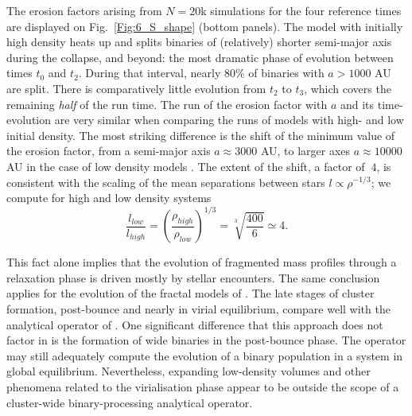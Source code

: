  The erosion factors arising from $N = 20$k simulations for the four reference times are displayed on  Fig.~\ref{Fig:6_S_shape} (bottom panels). 
%
The model with initially high density heats up and splits binaries of  (relatively) shorter semi-major axis  during the collapse, and beyond: the most dramatic phase of evolution between times  $t_0$ and $t_2$. During that interval,  nearly 80\% of  binaries with $a > 1000 $ AU are split. There is comparatively little evolution from $t_2$ to $t_3$,  which covers the remaining {\it half} of the run time.  
The run of the erosion factor with $a$  and its time-evolution are very similar  when comparing the runs of models with  high- and low initial  density. The most striking difference is the shift of the minimum value of the erosion factor, from a semi-major axis $a \approx 3 000$ AU, to larger axes $a \approx 10 000$ AU  in the case of low density models .  The extent of the shift, a factor of $~4$, is consistent with the scaling of the mean separations between stars $ l \propto \rho^{-1/3}$; we compute for high and low density systems 
\begin{equation}
\frac{l_{low}}{l_{high}} = \left(  \frac{\rho_{high}}{\rho_{low}}\right)^{1/3} = \sqrt[3]{\frac{400}{6}} \simeq 4 .
\end{equation}

This fact alone implies that the evolution of fragmented mass profiles through a relaxation phase is driven mostly by stellar encounters. The same conclusion applies for the evolution of the  fractal models of \cite{Parker2011}. 
The late stages of cluster formation, post-bounce and nearly in virial equilibrium, compare well with the 
analytical operator  of \cite{Marks2012}. One significant difference that this approach does not factor in is the formation of wide binaries in the post-bounce phase. The operator may still adequately compute  the evolution of a binary population in a system in global  equilibrium. Nevertheless, expanding low-density volumes and other phenomena related to the virialisation phase appear to be outside the scope of a cluster-wide binary-processing analytical  operator. 


